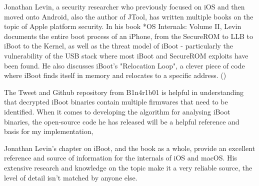 Jonathan Levin, a security researcher who previously focused on iOS and then moved onto Android, also the author of JTool, has written multiple books on the topic of Apple platform security. In his book *OS Internals: Volume II, Levin documents the entire boot process of an iPhone, from the SecureROM to LLB to iBoot to the Kernel, as well as the threat model of iBoot - particularly the vulnerability of the USB stack where most iBoot and SecureROM exploits have been found. He also discusses iBoot's "Relocation Loop", a clever piece of code where iBoot finds itself in memory and relocates to a specific address. (\cite{levin-os-internals-vol2-iboot})


The Tweet and Github repository from B1n4r1b01 is helpful in understanding that decrypted iBoot binaries contain multiple firmwares that need to be identified. When it comes to developing the algorithm for analysing iBoot binaries, the open-source code he has released will be a helpful reference and basis for my implementation,

Jonathan Levin's chapter on iBoot, and the book as a whole, provide an excellent reference and source of information for the internals of iOS and macOS. His extensive research and knowledge on the topic make it a very reliable source, the level of detail isn't matched by anyone else. 


